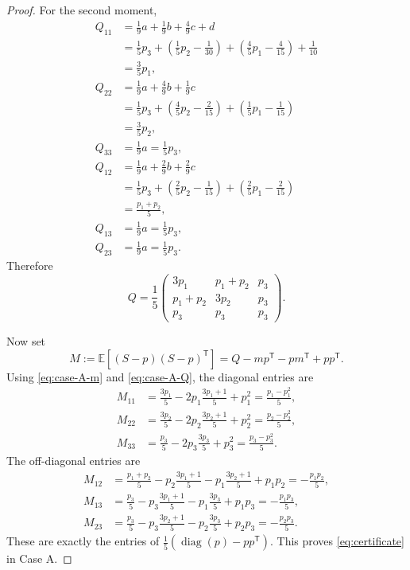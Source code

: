 \documentclass[11pt]{article}
\theoremstyle{definition}
\theoremstyle{remark}
\newcommand{\E}{\mathbb{E}}
\newcommand{\diag}{\operatorname{diag}}
\begin{document}
\begin{proof}
For the second moment,
\begin{align*}
Q_{11}
&=\frac19a+\frac19b+\frac49c+d\\
&=\frac15p_3+\left(\frac15p_2-\frac1{30}\right)
 +\left(\frac45p_1-\frac4{15}\right)+\frac1{10}\\
&=\frac35p_1,\\[3pt]
Q_{22}
&=\frac19a+\frac49b+\frac19c\\
&=\frac15p_3+\left(\frac45p_2-\frac2{15}\right)
 +\left(\frac15p_1-\frac1{15}\right)\\
&=\frac35p_2,\\[3pt]
Q_{33}
&=\frac19a=\frac15p_3,\\[3pt]
Q_{12}
&=\frac19a+\frac29b+\frac29c\\
&=\frac15p_3+\left(\frac25p_2-\frac1{15}\right)
 +\left(\frac25p_1-\frac2{15}\right)\\
&=\frac{p_1+p_2}{5},\\[3pt]
Q_{13}&=\frac19a=\frac15p_3,\\
Q_{23}&=\frac19a=\frac15p_3.
\end{align*}
Therefore
\begin{equation}
Q=\frac15
\begin{pmatrix}
3p_1&p_1+p_2&p_3\\
p_1+p_2&3p_2&p_3\\
p_3&p_3&p_3
\end{pmatrix}.
\label{eq:case-A-Q}
\end{equation}

Now set
\begin{equation}
M:=\E[(S-p)(S-p)^{\mathsf T}]
=Q-mp^{\mathsf T}-pm^{\mathsf T}+pp^{\mathsf T}.
\label{eq:M-from-mQ}
\end{equation}
Using \eqref{eq:case-A-m} and \eqref{eq:case-A-Q}, the diagonal entries are
\begin{align*}
M_{11}
&=\frac{3p_1}{5}-2p_1\frac{3p_1+1}{5}+p_1^2
=\frac{p_1-p_1^2}{5},\\
M_{22}
&=\frac{3p_2}{5}-2p_2\frac{3p_2+1}{5}+p_2^2
=\frac{p_2-p_2^2}{5},\\
M_{33}
&=\frac{p_3}{5}-2p_3\frac{3p_3}{5}+p_3^2
=\frac{p_3-p_3^2}{5}.
\end{align*}
The off-diagonal entries are
\begin{align*}
M_{12}
&=\frac{p_1+p_2}{5}
 -p_2\frac{3p_1+1}{5}
 -p_1\frac{3p_2+1}{5}+p_1p_2
=-\frac{p_1p_2}{5},\\
M_{13}
&=\frac{p_3}{5}
 -p_3\frac{3p_1+1}{5}
 -p_1\frac{3p_3}{5}+p_1p_3
=-\frac{p_1p_3}{5},\\
M_{23}
&=\frac{p_3}{5}
 -p_3\frac{3p_2+1}{5}
 -p_2\frac{3p_3}{5}+p_2p_3
=-\frac{p_2p_3}{5}.
\end{align*}
These are exactly the entries of $\frac15(\diag(p)-pp^{\mathsf T})$.  This proves \eqref{eq:certificate} in Case A.


\end{proof}
\end{document}
